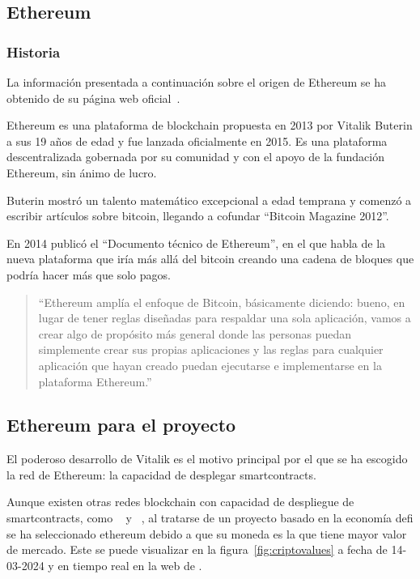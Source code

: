 \subsection{Ethereum}
\subsubsection{Historia}
La información presentada a continuación
sobre el origen  de Ethereum
se ha obtenido de su página web oficial~\cite{ethereumVitalikHistoria}.

Ethereum es una plataforma de \gls{blockchain} propuesta en 2013 por Vitalik Buterin 
a sus 19 años de edad y fue lanzada oficialmente en 2015. Es una plataforma descentralizada 
gobernada por su comunidad y con el apoyo de la fundación Ethereum, sin ánimo de 
lucro.

Buterin mostró un talento matemático excepcional a edad temprana y comenzó a escribir 
artículos sobre \gls{bitcoin}, llegando a cofundar \enquote{Bitcoin Magazine 2012}.

En 2014 publicó el \enquote{Documento técnico de Ethereum}, en el que habla de la nueva
plataforma que iría más allá del \gls{bitcoin} creando una cadena de bloques que podría 
hacer más que solo pagos.

\begin{quote}
    ``Ethereum amplía el enfoque de Bitcoin,
    básicamente diciendo: bueno, en lugar de tener
    reglas diseñadas para respaldar una sola
    aplicación, vamos a crear algo de propósito
    más general donde las personas puedan
    simplemente crear sus propias aplicaciones
    y las reglas para cualquier aplicación que
    hayan creado puedan ejecutarse e implementarse
    en la plataforma Ethereum.''
    \citeauthor{ethereumVitalikHistoria}~\cite{ethereumVitalikHistoria}
\end{quote}

\subsection{Ethereum para el proyecto}
El poderoso desarrollo de Vitalik es el motivo principal por el que se ha escogido
la red de Ethereum: la capacidad de desplegar \glspl{smartcontract}.

Aunque existen otras redes \gls{blockchain} con capacidad de despliegue de 
\glspl{smartcontract}, como \citetitle{[9]}~\cite{[9]} y 
\citetitle{[10]}~\cite{[10]}, al tratarse de un proyecto basado en la economía 
\gls{defi} se ha seleccionado \gls{ethereum} debido a que su moneda es la que 
tiene mayor valor de mercado. 
Este se puede visualizar en la figura~\ref{fig:criptovalues} a 
fecha de 14-03-2024 y en tiempo real en la web de \citetitle{[35]} \cite{[35]}.

